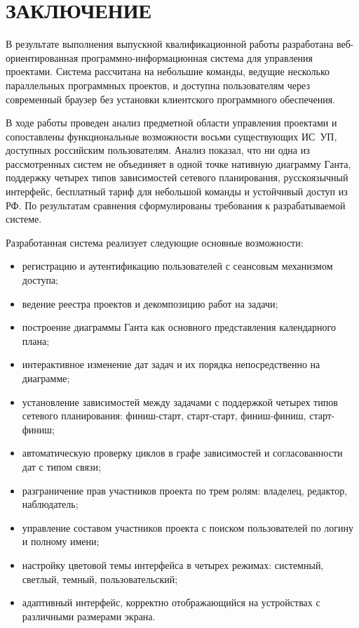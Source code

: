 \section*{ЗАКЛЮЧЕНИЕ}

В результате выполнения выпускной квалификационной работы разработана веб-ориентированная программно-информационная система для управления проектами. Система рассчитана на небольшие команды, ведущие несколько параллельных программных проектов, и доступна пользователям через современный браузер без установки клиентского программного обеспечения.

В ходе работы проведен анализ предметной области управления проектами и сопоставлены функциональные возможности восьми существующих ИС~УП, доступных российским пользователям. Анализ показал, что ни одна из рассмотренных систем не объединяет в одной точке нативную диаграмму Ганта, поддержку четырех типов зависимостей сетевого планирования, русскоязычный интерфейс, бесплатный тариф для небольшой команды и устойчивый доступ из РФ. По результатам сравнения сформулированы требования к разрабатываемой системе.

Разработанная система реализует следующие основные возможности:
\begin{itemize}
    \item регистрацию и аутентификацию пользователей с сеансовым механизмом доступа;
    \item ведение реестра проектов и декомпозицию работ на задачи;
    \item построение диаграммы Ганта как основного представления календарного плана;
    \item интерактивное изменение дат задач и их порядка непосредственно на диаграмме;
    \item установление зависимостей между задачами с поддержкой четырех типов сетевого планирования: финиш-старт, старт-старт, финиш-финиш, старт-финиш;
    \item автоматическую проверку циклов в графе зависимостей и согласованности дат с типом связи;
    \item разграничение прав участников проекта по трем ролям: владелец, редактор, наблюдатель;
    \item управление составом участников проекта с поиском пользователей по логину и полному имени;
    \item настройку цветовой темы интерфейса в четырех режимах: системный, светлый, темный, пользовательский;
    \item адаптивный интерфейс, корректно отображающийся на устройствах с различными размерами экрана.
\end{itemize}


